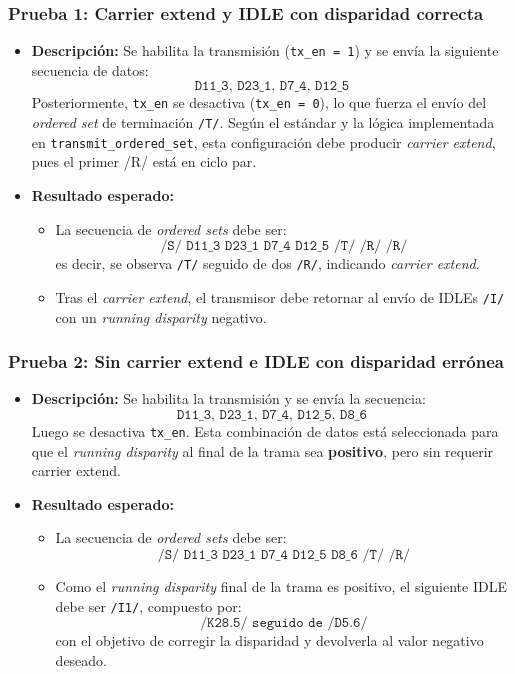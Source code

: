 \subsubsection*{Prueba 1: Carrier extend y IDLE con disparidad correcta}

\begin{itemize}
  \item \textbf{Descripción:} Se habilita la transmisión (\texttt{tx\_en = 1}) y se envía la siguiente secuencia de datos:
    \[
      \texttt{D11\_3, D23\_1, D7\_4, D12\_5}
    \]
    Posteriormente, \texttt{tx\_en} se desactiva (\texttt{tx\_en = 0}), lo que fuerza el envío del \textit{ordered set} de terminación \texttt{/T/}. Según el estándar y la lógica implementada en \texttt{transmit\_ordered\_set}, esta configuración debe producir \emph{carrier extend}, pues el primer /R/ está en ciclo par.
  \item \textbf{Resultado esperado:}
    \begin{itemize}
      \item La secuencia de \textit{ordered sets} debe ser:
      \[
        \texttt{/S/ D11\_3 D23\_1 D7\_4 D12\_5 /T/ /R/ /R/}
      \]
      es decir, se observa \texttt{/T/} seguido de dos \texttt{/R/}, indicando \textit{carrier extend}.
      \item Tras el \textit{carrier extend}, el transmisor debe retornar al envío de IDLEs \texttt{/I/} con un \emph{running disparity} negativo.
    \end{itemize}
\end{itemize}

\subsubsection*{Prueba 2: Sin carrier extend e IDLE con disparidad errónea}

\begin{itemize}
  \item \textbf{Descripción:} Se habilita la transmisión y se envía la secuencia:
    \[
      \texttt{D11\_3, D23\_1, D7\_4, D12\_5, D8\_6}
    \]
    Luego se desactiva \texttt{tx\_en}. Esta combinación de datos está seleccionada para que el \emph{running disparity} al final de la trama sea \textbf{positivo}, pero sin requerir carrier extend.
  \item \textbf{Resultado esperado:}
    \begin{itemize}
      \item La secuencia de \textit{ordered sets} debe ser:
      \[
        \texttt{/S/ D11\_3 D23\_1 D7\_4 D12\_5 D8\_6 /T/ /R/}
      \]
      \item Como el \textit{running disparity} final de la trama es positivo, el siguiente IDLE debe ser \texttt{/I1/}, compuesto por:
        \[
          \texttt{/K28.5/ seguido de /D5.6/}
        \]
        con el objetivo de corregir la disparidad y devolverla al valor negativo deseado.
    \end{itemize}
\end{itemize}

